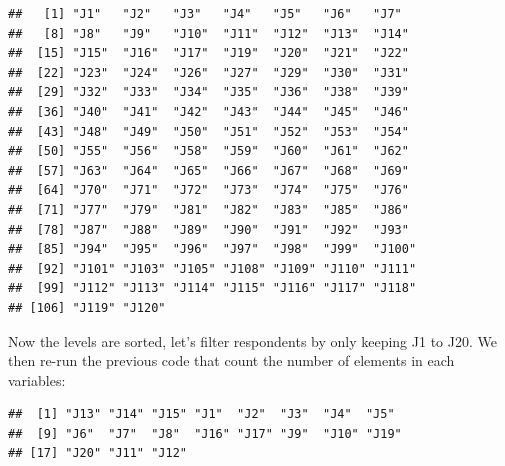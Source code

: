 \documentclass[
]{krantz}
\makeatletter
\newenvironment{Shaded}{\begin{snugshade}}{\end{snugshade}}
\newcommand{\DecValTok}[1]{\textcolor[rgb]{0.06,0.06,0.06}{#1}}
\newcommand{\FunctionTok}[1]{\textcolor[rgb]{0,0,0}{#1}}
\newcommand{\NormalTok}[1]{#1}
\newcommand{\OtherTok}[1]{\textcolor[rgb]{0.37,0.37,0.37}{#1}}
\newcommand{\SpecialCharTok}[1]{\textcolor[rgb]{0,0,0}{#1}}
\newcommand{\StringTok}[1]{\textcolor[rgb]{0.5,0.5,0.5}{#1}}
\newenvironment{kframe}{%
\medskip{}
\setlength{\fboxsep}{.8em}
 \def\at@end@of@kframe{}%
 \ifinner\ifhmode%
  \def\at@end@of@kframe{\end{minipage}}%
  \begin{minipage}{\columnwidth}%
 \fi\fi%
 \def\FrameCommand##1{\hskip\@totalleftmargin \hskip-\fboxsep
 \colorbox{shadecolor}{##1}\hskip-\fboxsep
     \hskip-\linewidth \hskip-\@totalleftmargin \hskip\columnwidth}%
 \MakeFramed {\advance\hsize-\width
   \@totalleftmargin\z@ \linewidth\hsize
   \@setminipage}}%
 {\par\unskip\endMakeFramed%
 \at@end@of@kframe}
\renewenvironment{Shaded}{\begin{kframe}}{\end{kframe}}
\makeatother
\begin{document}
\begin{verbatim}
##   [1] "J1"   "J2"   "J3"   "J4"   "J5"   "J6"   "J7"  
##   [8] "J8"   "J9"   "J10"  "J11"  "J12"  "J13"  "J14" 
##  [15] "J15"  "J16"  "J17"  "J19"  "J20"  "J21"  "J22" 
##  [22] "J23"  "J24"  "J26"  "J27"  "J29"  "J30"  "J31" 
##  [29] "J32"  "J33"  "J34"  "J35"  "J36"  "J38"  "J39" 
##  [36] "J40"  "J41"  "J42"  "J43"  "J44"  "J45"  "J46" 
##  [43] "J48"  "J49"  "J50"  "J51"  "J52"  "J53"  "J54" 
##  [50] "J55"  "J56"  "J58"  "J59"  "J60"  "J61"  "J62" 
##  [57] "J63"  "J64"  "J65"  "J66"  "J67"  "J68"  "J69" 
##  [64] "J70"  "J71"  "J72"  "J73"  "J74"  "J75"  "J76" 
##  [71] "J77"  "J79"  "J81"  "J82"  "J83"  "J85"  "J86" 
##  [78] "J87"  "J88"  "J89"  "J90"  "J91"  "J92"  "J93" 
##  [85] "J94"  "J95"  "J96"  "J97"  "J98"  "J99"  "J100"
##  [92] "J101" "J103" "J105" "J108" "J109" "J110" "J111"
##  [99] "J112" "J113" "J114" "J115" "J116" "J117" "J118"
## [106] "J119" "J120"
\end{verbatim}

Now the levels are sorted, let's filter respondents by only keeping J1 to J20. We then re-run the previous code that count the number of elements in each variables:

\begin{Shaded}
\end{Shaded}

\begin{verbatim}
##  [1] "J13" "J14" "J15" "J1"  "J2"  "J3"  "J4"  "J5" 
##  [9] "J6"  "J7"  "J8"  "J16" "J17" "J9"  "J10" "J19"
## [17] "J20" "J11" "J12"
\end{verbatim}

\begin{Shaded}
\end{Shaded}
\end{document}
